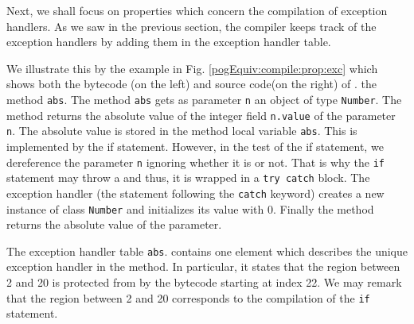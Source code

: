 Next, we shall focus on properties which concern the compilation of exception handlers. 
As we saw in the previous section, the compiler keeps track of the exception 
handlers by adding them in the exception handler table. 

We illustrate this by the example in Fig. \ref{pogEquiv:compile:prop:exc} which shows both the bytecode (on the left) and source code(on the right)
 of . the method \lstinline!abs!.
The method \lstinline!abs! gets as parameter \lstinline!n! an object of type  \lstinline!Number!.
 The method returns  the absolute value of the integer field \lstinline!n.value! of the parameter \lstinline!n!. The absolute value is stored
in the method local variable \lstinline!abs!. This is implemented by the if statement. However, in the test of the if statement, we dereference
 the parameter  \lstinline!n! ignoring whether it is \Mynull{} or not. That is why the \lstinline!if! statement may throw a \NullPointerExc{} and thus,
 it is wrapped in a \lstinline!try catch! block. 
The exception handler (the statement following the \lstinline!catch! keyword)
 creates a new instance of class \lstinline!Number! and initializes its value with 0. 
Finally the method returns the absolute value of the parameter.

 The exception handler table  \lstinline!abs!.\ExcHandler{}  contains one element which describes the unique exception handler
in the method. In particular, it states that the region between 2 and 20 is protected from \NullPointerExc{} by the bytecode starting at index 22.
 We may remark that the region between 2 and 20 corresponds to the compilation of the \lstinline!if! statement. 

